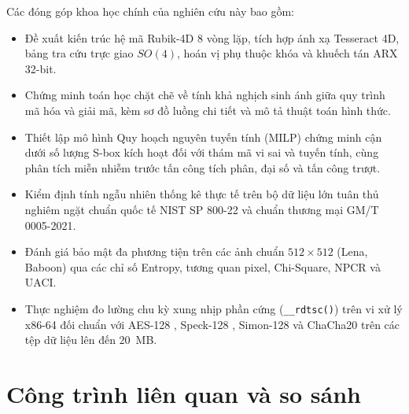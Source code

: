 \documentclass[10pt,twocolumn]{article}
\begin{document}
Các đóng góp khoa học chính của nghiên cứu này bao gồm:
\begin{itemize}
    \item Đề xuất kiến trúc hệ mã Rubik-4D 8 vòng lặp, tích hợp ánh xạ Tesseract 4D, bảng tra cứu trực giao $SO(4)$, hoán vị phụ thuộc khóa và khuếch tán ARX 32-bit.
    \item Chứng minh toán học chặt chẽ về tính khả nghịch sinh ánh giữa quy trình mã hóa và giải mã, kèm sơ đồ luồng chi tiết và mô tả thuật toán hình thức.
    \item Thiết lập mô hình Quy hoạch nguyên tuyến tính (MILP) chứng minh cận dưới số lượng S-box kích hoạt đối với thám mã vi sai và tuyến tính, cùng phân tích miễn nhiễm trước tấn công tích phân, đại số và tấn công trượt.
    \item Kiểm định tính ngẫu nhiên thống kê thực tế trên bộ dữ liệu lớn tuân thủ nghiêm ngặt chuẩn quốc tế NIST SP 800-22 và chuẩn thương mại GM/T 0005-2021.
    \item Đánh giá bảo mật đa phương tiện trên các ảnh chuẩn $512 \times 512$ (Lena, Baboon) qua các chỉ số Entropy, tương quan pixel, Chi-Square, NPCR và UACI.
    \item Thực nghiệm đo lường chu kỳ xung nhịp phần cứng (\texttt{\_\_rdtsc()}) trên vi xử lý x86-64 đối chuẩn với AES-128 \cite{nist2001fips}, Speck-128 \cite{beaulieu2015simon}, Simon-128 \cite{beaulieu2015simon} và ChaCha20 \cite{nir2018chacha20} trên các tệp dữ liệu lên đến $20$~MB.
\end{itemize}

\section{Công trình liên quan và so sánh}
\label{sec:related_work}
\end{document}

